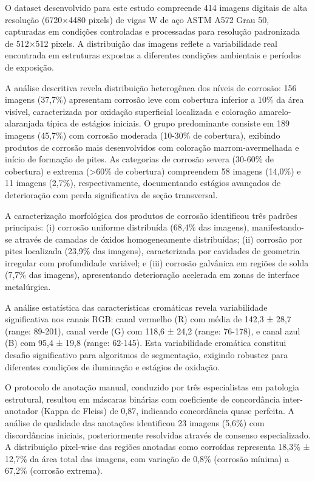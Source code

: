 \documentclass[12pt,a4paper,twoside]{article}
\begin{document}
O dataset desenvolvido para este estudo compreende 414 imagens digitais de alta resolução (6720×4480 pixels) de vigas W de aço ASTM A572 Grau 50, capturadas em condições controladas e processadas para resolução padronizada de 512×512 pixels. A distribuição das imagens reflete a variabilidade real encontrada em estruturas expostas a diferentes condições ambientais e períodos de exposição.

A análise descritiva revela distribuição heterogênea dos níveis de corrosão: 156 imagens (37,7\%) apresentam corrosão leve com cobertura inferior a 10\% da área visível, caracterizada por oxidação superficial localizada e coloração amarelo-alaranjada típica de estágios iniciais. O grupo predominante consiste em 189 imagens (45,7\%) com corrosão moderada (10-30\% de cobertura), exibindo produtos de corrosão mais desenvolvidos com coloração marrom-avermelhada e início de formação de pites. As categorias de corrosão severa (30-60\% de cobertura) e extrema (>60\% de cobertura) compreendem 58 imagens (14,0\%) e 11 imagens (2,7\%), respectivamente, documentando estágios avançados de deterioração com perda significativa de seção transversal.

A caracterização morfológica dos produtos de corrosão identificou três padrões principais: (i) corrosão uniforme distribuída (68,4\% das imagens), manifestando-se através de camadas de óxidos homogeneamente distribuídas; (ii) corrosão por pites localizada (23,9\% das imagens), caracterizada por cavidades de geometria irregular com profundidade variável; e (iii) corrosão galvânica em regiões de solda (7,7\% das imagens), apresentando deterioração acelerada em zonas de interface metalúrgica.

A análise estatística das características cromáticas revela variabilidade significativa nos canais RGB: canal vermelho (R) com média de 142,3 ± 28,7 (range: 89-201), canal verde (G) com 118,6 ± 24,2 (range: 76-178), e canal azul (B) com 95,4 ± 19,8 (range: 62-145). Esta variabilidade cromática constitui desafio significativo para algoritmos de segmentação, exigindo robustez para diferentes condições de iluminação e estágios de oxidação.

O protocolo de anotação manual, conduzido por três especialistas em patologia estrutural, resultou em máscaras binárias com coeficiente de concordância inter-anotador (Kappa de Fleiss) de 0,87, indicando concordância quase perfeita. A análise de qualidade das anotações identificou 23 imagens (5,6\%) com discordâncias iniciais, posteriormente resolvidas através de consenso especializado. A distribuição pixel-wise das regiões anotadas como corroídas representa 18,3\% ± 12,7\% da área total das imagens, com variação de 0,8\% (corrosão mínima) a 67,2\% (corrosão extrema).
\end{document}
